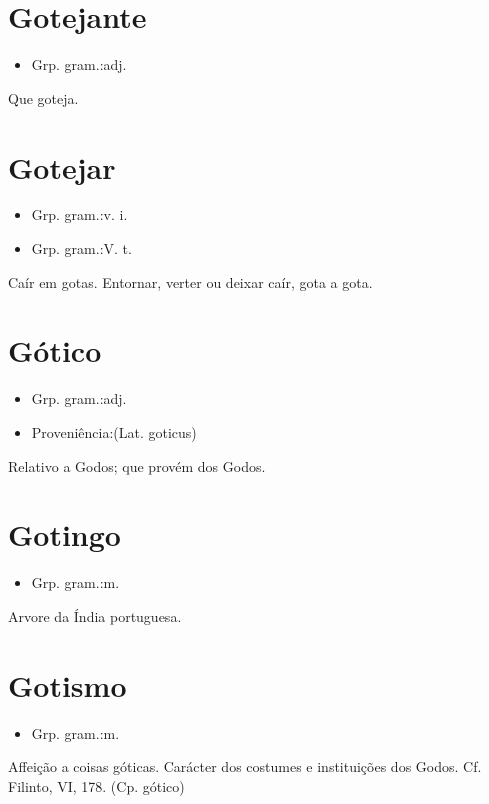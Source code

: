 \section{Gotejante}
\begin{itemize}
\item {Grp. gram.:adj.}
\end{itemize}
Que goteja.
\section{Gotejar}
\begin{itemize}
\item {Grp. gram.:v. i.}
\end{itemize}
\begin{itemize}
\item {Grp. gram.:V. t.}
\end{itemize}
Caír em gotas.
Entornar, verter ou deixar caír, gota a gota.
\section{Gótico}
\begin{itemize}
\item {Grp. gram.:adj.}
\end{itemize}
\begin{itemize}
\item {Proveniência:(Lat. \textunderscore goticus\textunderscore )}
\end{itemize}
Relativo a Godos; que provém dos Godos.
\section{Gotingo}
\begin{itemize}
\item {Grp. gram.:m.}
\end{itemize}
Arvore da Índia portuguesa.
\section{Gotismo}
\begin{itemize}
\item {Grp. gram.:m.}
\end{itemize}
Affeição a coisas góticas.
Carácter dos costumes e instituições dos Godos. Cf. Filinto, VI, 178.
(Cp. \textunderscore gótico\textunderscore )

